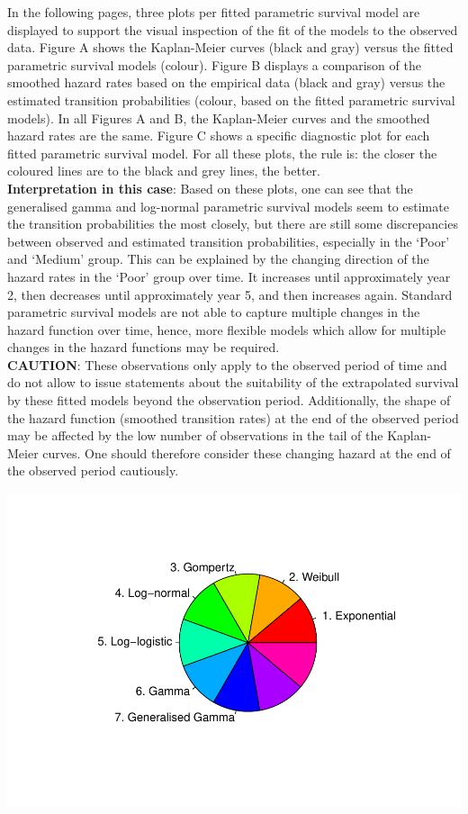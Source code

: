 \documentclass[]{article}
\begin{document}
In the following pages, three plots per fitted parametric survival model
are displayed to support the visual inspection of the fit of the models
to the observed data. Figure A shows the Kaplan-Meier curves (black and
gray) versus the fitted parametric survival models (colour). Figure B
displays a comparison of the smoothed hazard rates based on the
empirical data (black and gray) versus the estimated transition
probabilities (colour, based on the fitted parametric survival models).
In all Figures A and B, the Kaplan-Meier curves and the smoothed hazard
rates are the same. Figure C shows a specific diagnostic plot for each
fitted parametric survival model. For all these plots, the rule is: the
closer the coloured lines are to the black and grey lines, the better.\\
\textbf{Interpretation in this case}: Based on these plots, one can see
that the generalised gamma and log-normal parametric survival models
seem to estimate the transition probabilities the most closely, but
there are still some discrepancies between observed and estimated
transition probabilities, especially in the `Poor' and `Medium' group.
This can be explained by the changing direction of the hazard rates in
the `Poor' group over time. It increases until approximately year 2,
then decreases until approximately year 5, and then increases again.
Standard parametric survival models are not able to capture multiple
changes in the hazard function over time, hence, more flexible models
which allow for multiple changes in the hazard functions may be
required.\\
\textbf{CAUTION}: These observations only apply to the observed period
of time and do not allow to issue statements about the suitability of
the extrapolated survival by these fitted models beyond the observation
period. Additionally, the shape of the hazard function (smoothed
transition rates) at the end of the observed period may be affected by
the low number of observations in the tail of the Kaplan-Meier curves.
One should therefore consider these changing hazard at the end of the
observed period cautiously.

\begin{flushleft}\includegraphics{Images/plot_parametric-1} \end{flushleft}
\end{document}
